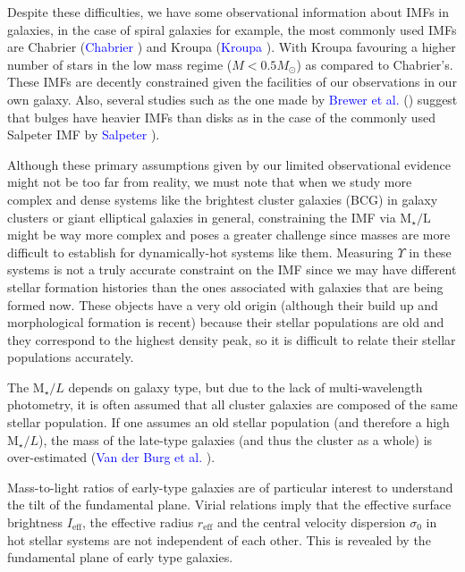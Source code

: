 Despite these difficulties, we have some observational information about IMFs in galaxies, in the case of spiral galaxies for example, the most commonly used IMFs are Chabrier (\textcolor{blue}{Chabrier} \citeyear{Reference31}) and Kroupa (\textcolor{blue}{Kroupa} \citeyear{Reference30}). With Kroupa favouring a higher number of stars in the low mass regime ($M<0.5M_{\odot}$) as compared to Chabrier's. These IMFs are decently constrained given the facilities of our observations in our own galaxy. Also, several studies such as the one made by \textcolor{blue}{Brewer et al.} (\citeyear{Reference16}) suggest that bulges have heavier IMFs than disks as in the case of the commonly used Salpeter IMF by \textcolor{blue}{Salpeter} \citeyear{Reference33}). 

Although these primary assumptions given by our limited observational evidence might not be too far from reality, we must note that when we study more complex and dense systems like the brightest cluster galaxies (BCG) in galaxy clusters or giant elliptical galaxies in general, constraining the IMF via $\textrm{M}_{\star}/\textrm{L}$ might be way more complex and poses a greater challenge since masses are more difficult to establish for dynamically-hot systems like them. Measuring $\Upsilon$ in these systems is not a truly accurate constraint on the IMF since we may have different stellar formation histories than the ones associated with galaxies that are being formed now. These objects have a very old origin (although their build up and morphological formation is recent) because their stellar populations are old and they correspond to the highest density peak, so it is difficult to relate their stellar populations accurately.

The $\text{M}_{\star}/L$ depends on galaxy type, but due to the lack of multi-wavelength photometry, it is often assumed that all cluster galaxies are composed of the same stellar population. If one assumes an old stellar population (and therefore a high $\text{M}_{\star}/L$), the mass of the late-type galaxies (and thus the cluster as a whole) is over-estimated (\textcolor{blue}{Van der Burg et al.} \citeyear{Reference2}).

Mass-to-light ratios of early-type galaxies are of particular interest to understand the tilt of the fundamental plane. Virial relations imply that the effective surface brightness $I_{\text{eff}}$, the effective radius $r_{\text{eff}}$ and the central velocity dispersion $\sigma_{0}$ in hot stellar systems are not independent of each other. This is revealed by the fundamental plane of early type galaxies.

